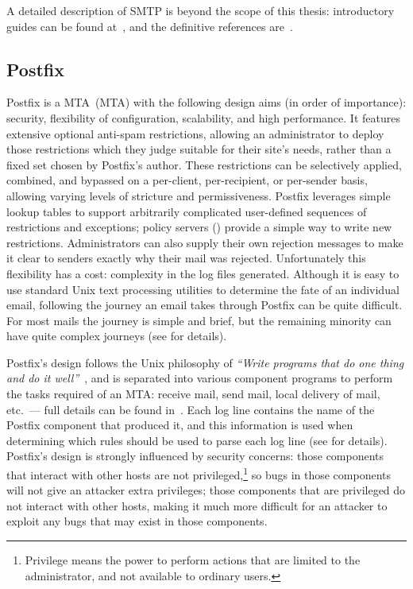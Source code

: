 A detailed description of \gls{SMTP} is beyond the scope of this thesis:
introductory guides can be found at~\cite{smtp-intro-01,smtp-intro-02},
and the definitive references are~\cite{RFC821,RFC2821}.

\subsection{Postfix}

\label{postfix background}

Postfix is a \acrlong{MTA}~(\gls{MTA}) with the following design aims (in
order of importance): security, flexibility of configuration, scalability,
and high performance.  It features extensive optional anti-spam
restrictions, allowing an administrator to deploy those restrictions which
they judge suitable for their site's needs, rather than a fixed set chosen
by Postfix's author.  These restrictions can be selectively applied,
combined, and bypassed on a per-client, per-recipient, or per-sender basis,
allowing varying levels of stricture and permissiveness.  Postfix leverages
simple lookup tables to support arbitrarily complicated user-defined
sequences of restrictions and exceptions; policy servers
() provide a simple way to write new
restrictions.  Administrators can also supply their own rejection messages
to make it clear to senders exactly why their mail was rejected.
Unfortunately this flexibility has a cost: complexity in the log files
generated.  Although it is easy to use standard Unix text processing
utilities to determine the fate of an individual email, following the
journey an email takes through Postfix can be quite difficult.  For most
mails the journey is simple and brief, but the remaining minority can have
quite complex journeys (see  for details).

Postfix's design follows the Unix philosophy of \textit{``Write programs
that do one thing and do it well''\/}~\cite{unix-philosophy}, and is
separated into various component programs to perform the tasks required of
an \gls{MTA}\@: receive mail, send mail, local delivery of mail, etc.\ ---
full details can be found in~\cite{postfix-overview}.  Each log line
contains the name of the Postfix component that produced it, and this
information is used when determining which rules should be used to parse
each log line (see  for details).
Postfix's design is strongly influenced by security concerns: those
components that interact with other hosts are not
privileged,\footnote{Privilege means the power to perform actions that are
limited to the administrator, and not available to ordinary users.} so bugs
in those components will not give an attacker extra privileges; those
components that are privileged do not interact with other hosts, making it
much more difficult for an attacker to exploit any bugs that may exist in
those components.

